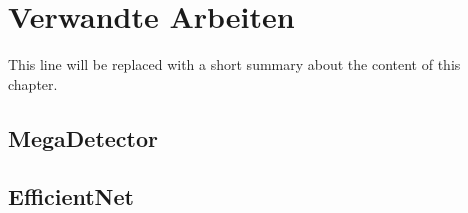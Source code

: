 \chapter{Verwandte Arbeiten} \label{chap:relatedwork}

This line will be replaced with a short summary about the content of this chapter.

\section{MegaDetector}

\section{EfficientNet} \label{sec:efficientnet}
